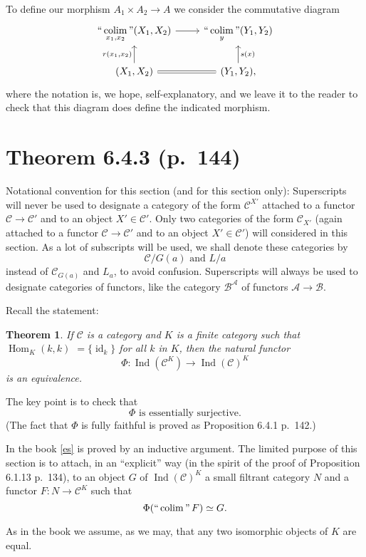 \documentclass[12pt]{article}
\newtheorem{thm}{Theorem}
\theoremstyle{remark}
\theoremstyle{definition}
\newcommand{\A}{\mathcal A}
\newcommand{\B}{\mathcal B}
\newcommand{\C}{\mathcal C}
\DeclareMathOperator*{\coli}{colim}
\DeclareMathOperator*{\ic}{``\coli"}
\DeclareMathOperator{\id}{id}
\DeclareMathOperator{\Hom}{Hom}%
\DeclareMathOperator{\Ind}{Ind}
\begin{document}
To define our morphism $A_1\times A_2\to A$ we consider the commutative diagram
$$
\begin{tikzcd}
\displaystyle\ic_{x_1,x_2}(X_1,X_2)\ar{r}&\displaystyle\ic_y(Y_1,Y_2)\\ 
(X_1,X_2)\ar{u}{r(x_1,x_2)}\ar[equal]{r}&(Y_1,Y_2),\ar{u}[swap]{s(x)}
\end{tikzcd}
$$ 
where the notation is, we hope, self-explanatory, and we leave it to the reader to check that this diagram does define the indicated morphism.
%
\section{Theorem 6.4.3 (p.~144)} %
%
Notational convention for this section (and for this section only): Superscripts will never be used to designate a category of the form $\C^{X'}$ attached to a functor $\C\to\C'$ and to an object $X'\in\C'$. Only two categories of the form $\C_{X'}$ (again attached to a functor $\C\to\C'$ and to an object $X'\in\C'$) will considered in this section. As a lot of subscripts will be used, we shall denote these categories by 
%
\begin{equation}\label{slice}
\C/G(a)\text{ and }L/a
\end{equation}
%
instead of $\C_{G(a)}$ and $L_a$, to avoid confusion. Superscripts will always be used to designate categories of functors, like the category $\B^\A$ of functors $\A\to\B$. 

Recall the statement: 
%
\begin{thm}
If $\C$ is a category and $K$ is a finite category such that $\Hom_K(k,k)$ $=\{\id_k\}$ for all $k$ in $K$, then the natural functor 
$$
\Phi:\Ind(\C^K)\to\Ind(\C)^K
$$ 
is an equivalence.
\end{thm}
%

The key point is to check that 
%
\begin{equation}\label{es} 
\Phi\text{ is essentially surjective.} 
\end{equation} 
%
(The fact that $\Phi$ is fully faithful is proved as Proposition 6.4.1 p.~142.) 

In the book \eqref{es} is proved by an inductive argument. The limited purpose of this section is to attach, in an ``explicit'' way (in the spirit of the proof of Proposition 6.1.13 p.~134), to an object $G$ of $\Ind(\C)^K$ a small filtrant category $N$ and a functor $F:N\to\C^K$ such that 
$$ 
\Phi(\ic F)\simeq G. 
$$ 

As in the book we assume, as we may, that any two isomorphic objects of $K$ are equal. 
\end{document}

